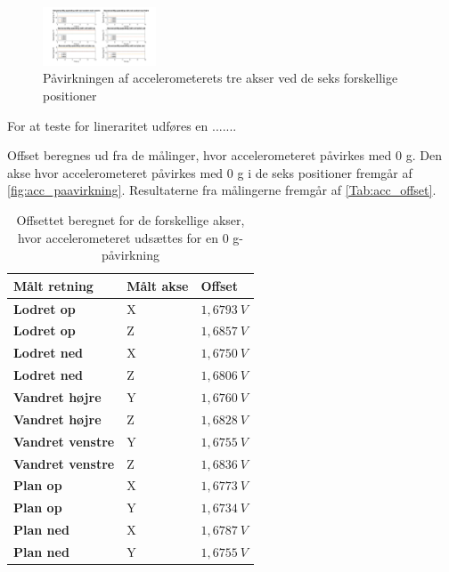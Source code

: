 \begin{figure}[H]
\centering
\includegraphics[width=0.3\textwidth]{figures/paavirkning}
\caption{Påvirkningen af accelerometerets tre akser ved de seks forskellige positioner}
\label{fig:paavirkning}
\end{figure}

For at teste for lineraritet udføres en .......

Offset beregnes ud fra de målinger, hvor accelerometeret påvirkes med 0 g. Den akse hvor accelerometeret påvirkes med 0 g i de seks positioner fremgår af \autoref{fig:acc_paavirkning}. Resultaterne fra målingerne fremgår af \autoref{Tab:acc_offset}. 

\begin{table}[H]
	\centering
	\begin{tabular}{|l|l|l|}
	\textbf{Målt retning} & \textbf{Målt akse} & \textbf{Offset} \\ \hline
    \textbf{Lodret op} 		& X 		& $1,6793~V$ 	\\ \hline
    \textbf{Lodret op} 		& Z 		& $1,6857~V$ 	 \\ \hline
    \textbf{Lodret ned}		& X 		& $1,6750~V$ 	\\ \hline
    \textbf{Lodret ned}		& Z 		& $1,6806~V$  	\\ \hline
    \textbf{Vandret højre} 	& Y 		& $1,6760~V$    \\ \hline     
    \textbf{Vandret højre} 	& Z 		& $1,6828~V$ 	\\ \hline
    \textbf{Vandret venstre}	& Y 		& $1,6755~V$ 	\\ \hline
    \textbf{Vandret venstre}	& Z 		& $1,6836~V$		\\ \hline
    \textbf{Plan op} 		& X 		& $1,6773~V$		\\ \hline		
    \textbf{Plan op} 		& Y 		& $1,6734~V$    \\ \hline
    \textbf{Plan ned} 		& X 		& $1,6787~V$		\\ \hline
    \textbf{Plan ned} 		& Y 		& $1,6755~V$		\\ \hline
	\end{tabular}
	\caption{Offsettet beregnet for de forskellige akser, hvor accelerometeret udsættes for en 0 g-påvirkning}
	\label{Tab:acc_offset}
\end{table}

